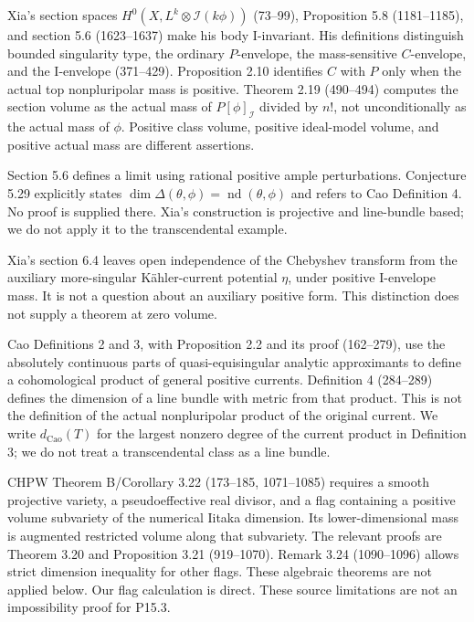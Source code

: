 \documentclass[11pt]{article}
\newcommand{\Ca}{\mathrm{Cao}}
\begin{document}
Xia's section spaces $H^0(X,L^k\otimes\mathcal I(k\phi))$ (73--99), Proposition 5.8 (1181--1185), and section 5.6 (1623--1637) make his body I-invariant. His definitions distinguish bounded singularity type, the ordinary $P$-envelope, the mass-sensitive $C$-envelope, and the I-envelope (371--429). Proposition 2.10 identifies $C$ with $P$ only when the actual top nonpluripolar mass is positive. Theorem 2.19 (490--494) computes the section volume as the actual mass of $P[\phi]_{\mathcal I}$ divided by $n!$, not unconditionally as the actual mass of $\phi$. Positive class volume, positive ideal-model volume, and positive actual mass are different assertions.

Section 5.6 defines a limit using rational positive ample perturbations. Conjecture 5.29 explicitly states $\dim\Delta(\theta,\phi)=\operatorname{nd}(\theta,\phi)$ and refers to Cao Definition 4. No proof is supplied there. Xia's construction is projective and line-bundle based; we do not apply it to the transcendental example.

Xia's section 6.4 leaves open independence of the Chebyshev transform from the auxiliary more-singular K\"ahler-current potential $\eta$, under positive I-envelope mass. It is not a question about an auxiliary positive form. This distinction does not supply a theorem at zero volume.

Cao Definitions 2 and 3, with Proposition 2.2 and its proof (162--279), use the absolutely continuous parts of quasi-equisingular analytic approximants to define a cohomological product of general positive currents. Definition 4 (284--289) defines the dimension of a line bundle with metric from that product. This is not the definition of the actual nonpluripolar product of the original current. We write $d_{\Ca}(T)$ for the largest nonzero degree of the current product in Definition 3; we do not treat a transcendental class as a line bundle.

CHPW Theorem B/Corollary 3.22 (173--185, 1071--1085) requires a smooth projective variety, a pseudoeffective real divisor, and a flag containing a positive volume subvariety of the numerical Iitaka dimension. Its lower-dimensional mass is augmented restricted volume along that subvariety. The relevant proofs are Theorem 3.20 and Proposition 3.21 (919--1070). Remark 3.24 (1090--1096) allows strict dimension inequality for other flags. These algebraic theorems are not applied below. Our flag calculation is direct. These source limitations are not an impossibility proof for P15.3.
\end{document}
